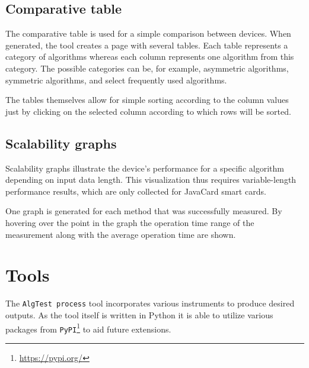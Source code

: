 \subsection{Comparative table}
The comparative table is used for a simple comparison between devices. When generated, the tool creates a page with several tables. Each table represents a category of algorithms whereas each column represents one algorithm from this category. The possible categories can be, for example, asymmetric algorithms, symmetric algorithms, and select frequently used algorithms.

The tables themselves allow for simple sorting according to the column values just by clicking on the selected column according to which rows will be sorted.


\subsection{Scalability graphs}
Scalability graphs illustrate the device's performance for a specific algorithm depending on input data length. This visualization thus requires variable-length performance results, which are only collected for JavaCard smart cards.

One graph is generated for each method that was successfully measured. By hovering over the point in the graph the operation time range of the measurement along with the average operation time are shown.





\section{Tools}\label{sec:tools}
The \texttt{AlgTest process} tool incorporates various instruments to produce desired outputs. As the tool itself is written in Python it is able to utilize various packages from \texttt{PyPI}\footnote{\url{https://pypi.org/}} to aid future extensions.

